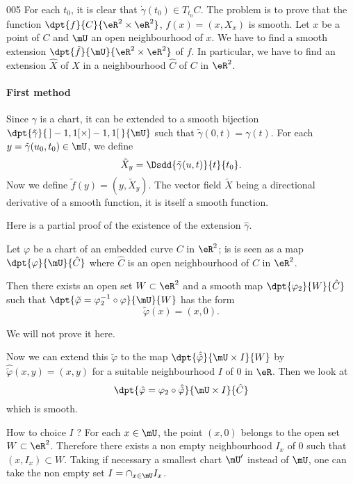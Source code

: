 \begin{corrige}{005}
For each $t_0$, it is clear that $\dot\gamma(t_0)\in T_{t_0}C$. The problem is to prove that the function $\dpt{ f }{ C }{ \eR^2\times\eR^2 }$, $f(x)=(x,X_x)$ is smooth. Let $x$ be a point of $C$ and $\mU$ an open neighbourhood of $x$. We have to find a smooth extension $\dpt{ \tilde f }{ \mU }{ \eR^2\times\eR^2 }$ of $f$. In particular, we have to find an extension $\hat X$ of $X$ in a neighbourhood $\hat C$ of $C$ in $\eR^2$.

\paragraph{First method}

Since $\gamma$ is a chart, it can be extended to a smooth bijection $\dpt{ \tilde\gamma }{ \,]-1,1[\times]-1,1[\, }{ \mU }$ such that $\tilde\gamma(0,t)=\gamma(t)$. For each $y=\tilde\gamma(u_0,t_0)\in \mU$, we define 
\[ 
  \tilde X_y=\Dsdd{ \tilde\gamma(u,t) }{t}{t_0}.
\]
Now we define $\tilde f(y)=(y,\tilde X_y)$. The vector field $\tilde X$ being a directional derivative of a smooth function, it is itself a smooth function.

Here is a partial proof of the existence of the extension $\hat\gamma$. 

\begin{lemma}
Let $\varphi$ be a chart of an embedded curve $C$ in $\eR^2$; is is seen as a map $\dpt{ \varphi }{ \mU }{ \hat C }$ where $\hat C$ is an open neighbourhood of $C$ in $\eR^2$.

Then there exists an open set $W\subset \eR^2$ and a smooth map $\dpt{ \varphi_2 }{W}{ \hat C }$ such that $\dpt{ \tilde\varphi=\varphi_2^{-1}\circ\varphi }{ \mU }{ W }$ has the form
\[ 
  \tilde\varphi(x)=(x,0).
\]

\end{lemma}
We will not prove it here.

Now we can extend this $\tilde\varphi$ to the map $\dpt{ \hat{\tilde\varphi} }{ \mU\times I }{ W }$ by $\hat{\tilde\varphi}(x,y)=(x,y)$ for a suitable neighbourhood $I$ of $0$ in $\eR$. Then we look at
\[ 
  \dpt{ \hat\varphi=\varphi_2\circ\hat{\tilde\varphi} }{ \mU\times I }{ \hat C }
\]
which is smooth.

How to choice $I$ ?  For each $x\in\mU$, the point $(x,0)$ belongs to the open set $W\subset \eR^2$. Therefore there exists a non empty neighbourhood $I_x$ of $0$ such that $(x,I_x)\subset W$. Taking if necessary a smallest chart $\mU'$ instead of $\mU$, one can take the non empty set
$I=\cap_{x\in\mU}I_x$.


\end{corrige}
